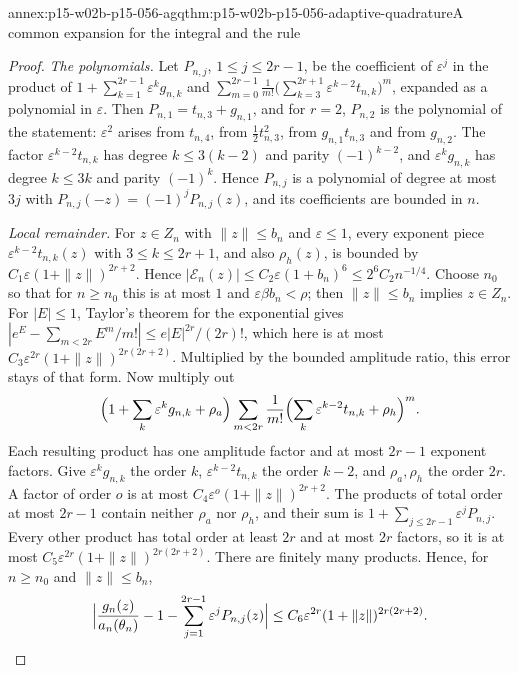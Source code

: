 \begin{annexitem}{annex:p15-w02b-p15-056-agq}{thm:p15-w02b-p15-056-adaptive-quadrature}{A common expansion for the integral and the rule}
\begin{proof}
\emph{The polynomials.} Let \(P_{n,j}\), \(1\leq j\leq2r-1\), be the
coefficient of \(\varepsilon^j\) in the product of
\(1+\sum_{k=1}^{2r-1}\varepsilon^kg_{n,k}\) and
\(\sum_{m=0}^{2r-1}\frac1{m!}\bigl(\sum_{k=3}^{2r+1}\varepsilon^{k-2}t_{n,k}\bigr)^m\),
expanded as a polynomial in \(\varepsilon\). Then
\(P_{n,1}=t_{n,3}+g_{n,1}\), and for \(r=2\), \(P_{n,2}\) is the
polynomial of the statement: \(\varepsilon^2\) arises from \(t_{n,4}\),
from \(\tfrac12t_{n,3}^2\), from \(g_{n,1}t_{n,3}\) and from \(g_{n,2}\).
The factor \(\varepsilon^{k-2}t_{n,k}\) has degree \(k\leq3(k-2)\) and
parity \((-1)^{k-2}\), and \(\varepsilon^kg_{n,k}\) has degree
\(k\leq3k\) and parity \((-1)^k\). Hence \(P_{n,j}\) is a polynomial of
degree at most \(3j\) with \(P_{n,j}(-z)=(-1)^jP_{n,j}(z)\), and its
coefficients are bounded in \(n\).

\emph{Local remainder.} For \(z\in Z_n\) with \(\|z\|\leq b_n\) and
\(\varepsilon\leq1\), every exponent piece \(\varepsilon^{k-2}t_{n,k}(z)\)
with \(3\leq k\leq2r+1\), and also \(\rho_h(z)\), is bounded by
\(C_1\varepsilon(1+\|z\|)^{2r+2}\). Hence
\(|\mathcal E_n(z)|\leq C_2\varepsilon(1+b_n)^6\leq2^6C_2n^{-1/4}\). Choose \(n_0\)
so that for \(n\geq n_0\) this is at most \(1\) and
\(\varepsilon\beta b_n<\rho\); then \(\|z\|\leq b_n\) implies \(z\in Z_n\).
For \(|E|\leq1\), Taylor's theorem for the exponential gives
\(|e^E-\sum_{m<2r}E^m/m!|\leq e|E|^{2r}/(2r)!\), which here is at most
\(C_3\varepsilon^{2r}(1+\|z\|)^{2r(2r+2)}\). Multiplied by the bounded
amplitude ratio, this error stays of that form. Now multiply out
\[
 \Bigl(1+\sum_k\varepsilon^kg_{n,k}+\rho_a\Bigr)
 \sum_{m<2r}\frac1{m!}\Bigl(\sum_k\varepsilon^{k-2}t_{n,k}+\rho_h\Bigr)^m .
\]
Each resulting product has one amplitude factor and at most \(2r-1\)
exponent factors. Give \(\varepsilon^kg_{n,k}\) the order \(k\),
\(\varepsilon^{k-2}t_{n,k}\) the order \(k-2\), and \(\rho_a,\rho_h\) the
order \(2r\). A factor of order \(o\) is at most
\(C_4\varepsilon^o(1+\|z\|)^{2r+2}\). The products of total order at most
\(2r-1\) contain neither \(\rho_a\) nor \(\rho_h\), and their sum is
\(1+\sum_{j\leq2r-1}\varepsilon^jP_{n,j}\). Every other product has total
order at least \(2r\) and at most \(2r\) factors, so it is at most
\(C_5\varepsilon^{2r}(1+\|z\|)^{2r(2r+2)}\). There are finitely many
products. Hence, for \(n\geq n_0\) and \(\|z\|\leq b_n\),
\[
 \Bigl|\frac{g_n(z)}{a_n(\theta_n)}-1-\sum_{j=1}^{2r-1}\varepsilon^jP_{n,j}(z)\Bigr|
 \leq C_6\varepsilon^{2r}(1+\|z\|)^{2r(2r+2)} .
\]


\end{proof}
\end{annexitem}
